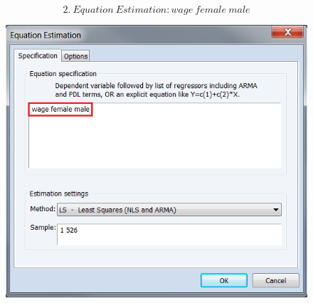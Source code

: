 \documentclass[12pt]{report}
\begin{document}
\vspace{-\baselineskip}
$$2.\ Equation\ Estimation: wage\ female\ male$$
\begin{figure}[H]
	\centering
	\includegraphics{q2_5}
\end{figure}
\vspace{-\baselineskip}
\end{document}
